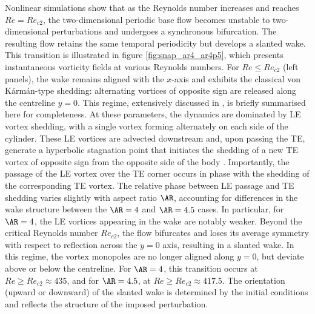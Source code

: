 Nonlinear simulations show that as the Reynolds number increases and reaches $Re = Re_{c2}$, the two-dimensional periodic base flow becomes unstable to two-dimensional perturbations and undergoes a synchronous bifurcation. The resulting flow retains the same temporal periodicity but develops a slanted wake. This transition is illustrated in figure \ref{fig:snap_ar4_ar4p5}, which presents instantaneous vorticity fields at various Reynolds numbers.
%
For $Re \le Re_{c2}$ (left panels), the wake remains aligned with the $x$-axis and exhibits the classical von K\'{a}rm\'{a}n-type shedding: alternating vortices of opposite sign are released along the centreline $y=0$. This regime, extensively discussed in \cite{chiarini-quadrio-auteri-2022}, is briefly summarised here for completeness. At these parameters, the dynamics are dominated by LE vortex shedding, with a single vortex forming alternately on each side of the cylinder. These LE vortices are advected downstream and, upon passing the TE, generate a hyperbolic stagnation point that initiates the shedding of a new TE vortex of opposite sign from the opposite side of the body \citep{chiarini-quadrio-auteri-2022}.
%
Importantly, the passage of the LE vortex over the TE corner occurs in phase with the shedding of the corresponding TE vortex. The relative phase between LE passage and TE shedding varies slightly with aspect ratio $\AR$, accounting for differences in the wake structure between the $\AR=4$ and $\AR=4.5$ cases. In particular, for $\AR=4$, the LE vortices appearing in the wake are notably weaker.
%
Beyond the critical Reynolds number $Re_{c2}$, the flow bifurcates and loses its average symmetry with respect to reflection across the $y=0$ axis, resulting in a slanted wake. In this regime, the vortex monopoles are no longer aligned along $y=0$, but deviate above or below the centreline. For $\AR=4$, this transition occurs at $Re \ge Re_{c2} \approx 435$, and for $\AR=4.5$, at $Re \ge Re_{c2} \approx 417.5$. The orientation (upward or downward) of the slanted wake is determined by the initial conditions and reflects the structure of the imposed perturbation.

